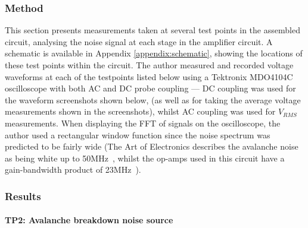 \documentclass[12pt]{article}
\begin{document}
    \subsubsection{Method}
    This section presents measurements taken at several test points in the assembled circuit, analysing the noise signal at each stage in the amplifier circuit. A schematic is available in Appendix \ref{appendix:schematic}, showing the locations of these test points within the circuit. The author measured and recorded voltage waveforms at each of the testpoints listed below using a Tektronix MDO4104C oscilloscope with both AC and DC probe coupling --- DC coupling was used for the waveform screenshots shown below, (as well as for taking the average voltage measurements shown in the screenshots), whilst AC coupling was used for $V_{RMS}$ measurements. When displaying the FFT of signals on the oscilloscope, the author used a rectangular window function since the noise spectrum was predicted to be fairly wide (The Art of Electronics describes the avalanche noise as being white up to 50MHz~\cite[p.~984]{art_of_electronics}, whilst the op-amps used in this circuit have a gain-bandwidth product of 23MHz~\cite{lt1215}).

    \newpage
    \subsubsection{Results}

      \paragraph{TP2: Avalanche breakdown noise source}

\end{document}
